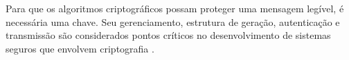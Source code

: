 \documentclass[12pt]{article}
\newcommand{\internet}{Internet\xspace}
\begin{document}
        Para que os algoritmos criptográficos possam proteger uma mensagem legível, é necessária uma chave. Seu gerenciamento, estrutura de geração, autenticação e transmissão são considerados pontos críticos no desenvolvimento de sistemas seguros que envolvem criptografia \cite{al2003certificateless}.
        
    

    
    
    
    
\end{document}
